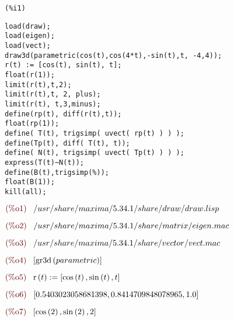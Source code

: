 \documentclass{article}
\begin{document}
\noindent
\begin{minipage}[t]{8ex}{\color{red}\bf
\begin{verbatim}
(%i1) 
\end{verbatim}}
\end{minipage}
\begin{minipage}[t]{\textwidth}{\color{blue}
\begin{verbatim}
load(draw);
load(eigen);
load(vect);
draw3d(parametric(cos(t),cos(4*t),-sin(t),t, -4,4));
r(t) := [cos(t), sin(t), t];
float(r(1));
limit(r(t),t,2);
limit(r(t),t, 2, plus);
limit(r(t), t,3,minus);
define(rp(t), diff(r(t),t));
float(rp(1));
define( T(t), trigsimp( uvect( rp(t) ) ) );
define(Tp(t), diff( T(t), t));
define( N(t), trigsimp( uvect( Tp(t) ) ) );
express(T(t)~N(t));
define(B(t),trigsimp(%));
float(B(1));
kill(all);
\end{verbatim}}
\end{minipage}
\begin{math}\displaystyle
\parbox{8ex}{\color{labelcolor}(\%o1) }
/usr/share/maxima/5.34.1/share/draw/draw.lisp
\end{math}

\begin{math}\displaystyle
\parbox{8ex}{\color{labelcolor}(\%o2) }
/usr/share/maxima/5.34.1/share/matrix/eigen.mac
\end{math}

\begin{math}\displaystyle
\parbox{8ex}{\color{labelcolor}(\%o3) }
/usr/share/maxima/5.34.1/share/vector/vect.mac
\end{math}

\begin{math}\displaystyle
\parbox{8ex}{\color{labelcolor}(\%o4) }
[\mathrm{gr3d}\left( parametric\right) ]
\end{math}

\begin{math}\displaystyle
\parbox{8ex}{\color{labelcolor}(\%o5) }
\mathrm{r}\left( t\right) :=[\mathrm{cos}\left( t\right) ,\mathrm{sin}\left( t\right) ,t]
\end{math}

\begin{math}\displaystyle
\parbox{8ex}{\color{labelcolor}(\%o6) }
[0.5403023058681398,0.8414709848078965,1.0]
\end{math}

\begin{math}\displaystyle
\parbox{8ex}{\color{labelcolor}(\%o7) }
[\mathrm{cos}\left( 2\right) ,\mathrm{sin}\left( 2\right) ,2]
\end{math}
\end{document}
